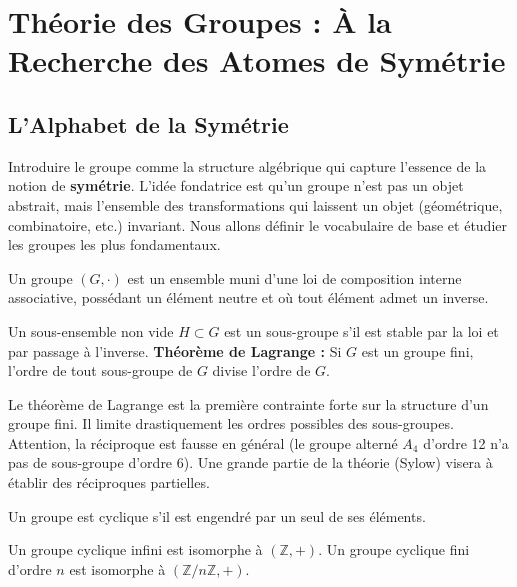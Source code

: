 \chapter{Théorie des Groupes : À la Recherche des Atomes de Symétrie}

\section{L'Alphabet de la Symétrie}

\begin{objectif}
    Introduire le groupe comme la structure algébrique qui capture l'essence de la notion de \textbf{symétrie}. L'idée fondatrice est qu'un groupe n'est pas un objet abstrait, mais l'ensemble des transformations qui laissent un objet (géométrique, combinatoire, etc.) invariant. Nous allons définir le vocabulaire de base et étudier les groupes les plus fondamentaux.
\end{objectif}

\begin{definition}[Groupe]
    Un groupe $(G, \cdot)$ est un ensemble muni d'une loi de composition interne associative, possédant un élément neutre et où tout élément admet un inverse.
\end{definition}

\begin{definition}
    Un sous-ensemble non vide $H \subset G$ est un sous-groupe s'il est stable par la loi et par passage à l'inverse.
    \textbf{Théorème de Lagrange :} Si $G$ est un groupe fini, l'ordre de tout sous-groupe de $G$ divise l'ordre de $G$.
\end{definition}

\begin{remark}
    Le théorème de Lagrange est la première contrainte forte sur la structure d'un groupe fini. Il limite drastiquement les ordres possibles des sous-groupes. Attention, la réciproque est fausse en général (le groupe alterné $A_4$ d'ordre 12 n'a pas de sous-groupe d'ordre 6). Une grande partie de la théorie (Sylow) visera à établir des réciproques partielles.
\end{remark}

\begin{definition}
    Un groupe est cyclique s'il est engendré par un seul de ses éléments.
\end{definition}

\begin{theorem}
    Un groupe cyclique infini est isomorphe à $(\mathbb{Z}, +)$. Un groupe cyclique fini d'ordre $n$ est isomorphe à $(\mathbb{Z}/n\mathbb{Z}, +)$.
\end{theorem}

